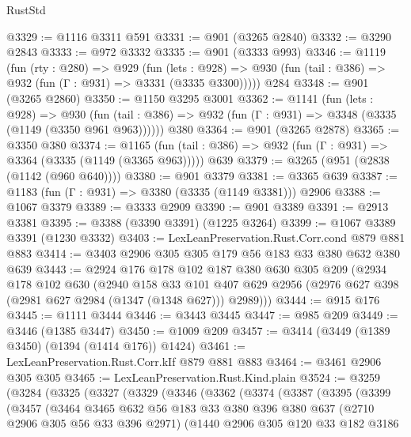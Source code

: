 \begin{lexlean}{RustStd}
\begin{coremodule}
{\begin{coremodule}
{{{{{{{{{{{{{{@3329 := @1116 @3311 @591
@3331 := @901 (@3265 @2840)
@3332 := @3290 @2843
@3333 := @972 @3332
@3335 := @901 (@3333 @993)
@3346 := @1119
    (fun (rty : @280) =>
    @929
      (fun (lets : @928) =>
      @930 (fun (tail : @386) => @932 (fun (Γ : @931) => @3331 (@3335 @3300)))))
    @284
@3348 := @901 (@3265 @2860)
@3350 := @1150 @3295 @3001
@3362 := @1141
    (fun (lets : @928) =>
    @930 (fun (tail : @386) => @932 (fun (Γ : @931) => @3348 (@3335 (@1149 (@3350 @961 @963))))))
    @380
@3364 := @901 (@3265 @2878)
@3365 := @3350 @380
@3374 := @1165
    (fun (tail : @386) => @932 (fun (Γ : @931) => @3364 (@3335 (@1149 (@3365 @963)))))
    @639
@3379 := @3265 (@951 (@2838 (@1142 (@960 @640))))
@3380 := @901 @3379
@3381 := @3365 @639
@3387 := @1183 (fun (Γ : @931) => @3380 (@3335 (@1149 @3381))) @2906
@3388 := @1067 @3379
@3389 := @3333 @2909
@3390 := @901 @3389
@3391 := @2913 @3381
@3395 := @3388 (@3390 @3391) (@1225 @3264)
@3399 := @1067 @3389 @3391 (@1230 @3332)
@3403 := LexLeanPreservation.Rust.Corr.cond @879 @881 @883
@3414 := @3403 @2906 @305 @305 @179 @56 @183 @33 @380 @632 @380 @639
@3443 := @2924
    @176
    @178
    @102
    @187
    @380
    @630
    @305
    @209
    (@2934
      @178
      @102
      @630
      (@2940
        @158
        @33
        @101
        @407
        @629
        @2956
        (@2976 @627 @398 (@2981 @627 @2984 (@1347 (@1348 @627))) @2989)))
@3444 := @915 @176
@3445 := @1111 @3444
@3446 := @3443 @3445
@3447 := @985 @209
@3449 := @3446 (@1385 @3447)
@3450 := @1009 @209
@3457 := @3414 (@3449 (@1389 @3450) (@1394 (@1414 @176)) @1424)
@3461 := LexLeanPreservation.Rust.Corr.kIf @879 @881 @883
@3464 := @3461 @2906 @305 @305
@3465 := LexLeanPreservation.Rust.Kind.plain
@3524 := @3259
    (@3284
      (@3325
        (@3327
          (@3329
            (@3346
              (@3362
                (@3374
                  (@3387
                    (@3395
                      (@3399
                        (@3457
                          (@3464
                            @3465
                            @632
                            @56
                            @183
                            @33
                            @380
                            @396
                            @380
                            @637
                            (@2710 @2906 @305 @56 @33 @396 @2971)
                            (@1440
                              @2906
                              @305
                              @120
                              @33
                              @182
                              @3186
}}}}}}}}}}}}}}
\end{coremodule}}
\end{coremodule}
\end{lexlean}
